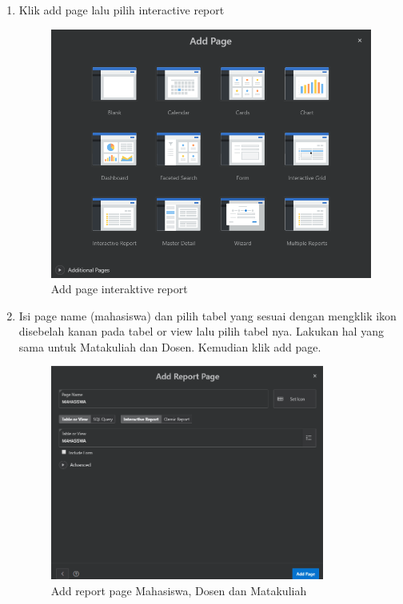 \begin{enumerate}
    \item Klik add page lalu pilih interactive report
        \begin{figure}[!htbp]
        \centering
        \includegraphics[width=13cm]{figures/10.PNG}
        \caption{Add page interaktive report}
    \end{figure}
    
    \newpage
    \item Isi page name (mahasiswa) dan pilih tabel yang sesuai dengan mengklik ikon disebelah kanan pada tabel or view lalu pilih tabel nya. Lakukan hal yang sama untuk Matakuliah dan Dosen. Kemudian klik add page.
        \begin{figure}[!htbp]
        \centering
        \includegraphics[width=9cm]{figures/18.PNG}
        \caption{Add report page Mahasiswa, Dosen dan Matakuliah}
    \end{figure}
    

\end{enumerate}

